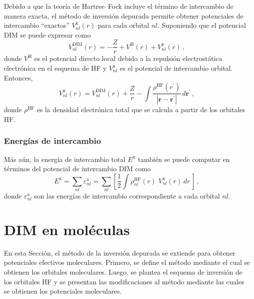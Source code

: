 Debido a que la teoría de Hartree--Fock incluye el término de 
intercambio de manera exacta, el método de inversión depurada 
permite obtener potenciales de intercambio ``exactos'' 
$V_{nl}^{\mathrm{x}}(r)$ para cada orbital $nl$. Suponiendo que el 
potencial DIM se puede expresar como
\begin{equation}
V_{nl}^{\mathrm{DIM}}(r) = -\frac{Z}{r} + V^{\mathrm{H}}(r) 
+ V_{nl}^{\mathrm{x}}(r) \, , 
\label{eq:VDIM}
\end{equation}
donde $V^{\mathrm{H}}$ es el potencial directo local debido a la 
repulsión electrostática electrónica en el esquema de HF y 
$V_{nl}^{\mathrm{x}}$ es el potencial de intercambio orbital. Entonces,
\begin{equation}
V_{nl}^{\mathrm{x}}(r)=V_{nl}^{\mathrm{DIM}}(r)+\frac{Z}{r}
-\int{ \frac{\rho^{\mathrm{HF}}(r^{\prime})  }
{\left| \mathbf{r} - \mathbf{r^{\prime}} \right|}} \, 
d \mathbf{r^{\prime}} \, ,
\label{eq:exchange-potential}
\end{equation}
donde $\rho^{\mathrm{HF}}$ es la densidad electrónica total que se
calcula a partir de los orbitales HF.

\subsubsection*{Energías de intercambio}

Más aún, la energía de intercambio total $E^{\mathrm{x}}$ también se 
puede computar en términos del potencial de intercambio DIM como
\begin{equation}
E^{\mathrm{x}} = \sum_{nl}\varepsilon_{nl}^{\mathrm{x}} = 
\sum_{nl}\left[\frac{1}{2}\int{\rho^{\mathrm{HF}}_{nl}(r) \, \, 
V_{nl}^{\mathrm{x}}}(r) \, dr \, \right]\,,
\label{eq:exchange-energy}
\end{equation}
donde $\varepsilon_{nl}^{\mathrm{x}}$ son las energías de intercambio 
correspondiente a cada orbital $nl$.


\section{DIM en moléculas}
\label{sec:dimmoleculas}

En esta Sección, el método de la inversión depurada se extiende para 
obtener potenciales efectivos moleculares. Primero, se define el método 
mediante el cual se obtienen los orbitales moleculares. Luego, se 
plantea el esquema de inversión de los orbitales HF y se presentan las 
modificaciones al método mediante las cuales se obtienen los potenciales 
moleculares.


